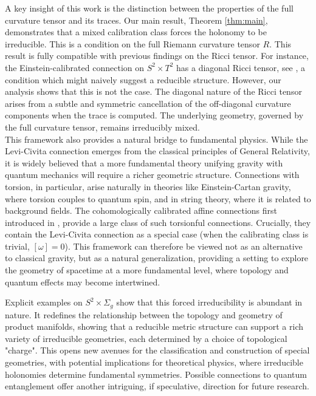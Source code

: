 \documentclass[12pt]{article}
\begin{document}
A key insight of this work is the distinction between the properties of the full curvature tensor and its traces. Our main result, Theorem \ref{thm:main}, demonstrates that a mixed calibration class forces the holonomy to be irreducible. This is a condition on the full Riemann curvature tensor $R$. This result is fully compatible with previous findings on the Ricci tensor. For instance, the Einstein-calibrated connection on $S^2 \times T^2$ has a diagonal Ricci tensor, see \cite{Pigazzini-Toda}, a condition which might naively suggest a reducible structure. However, our analysis shows that this is not the case. The diagonal nature of the Ricci tensor arises from a subtle and symmetric cancellation of the off-diagonal curvature components when the trace is computed. The underlying geometry, governed by the full curvature tensor, remains irreducibly mixed.
\\
This framework also provides a natural bridge to fundamental physics. While the Levi-Civita connection emerges from the classical principles of General Relativity, it is widely believed that a more fundamental theory unifying gravity with quantum mechanics will require a richer geometric structure. Connections with torsion, in particular, arise naturally in theories like Einstein-Cartan gravity, where torsion couples to quantum spin, and in string theory, where it is related to background fields. The cohomologically calibrated affine connections first introduced in \cite{Pigazzini}, provide a large class of such torsionful connections. Crucially, they contain the Levi-Civita connection as a special case (when the calibrating class is trivial, $[\omega]=0$). This framework can therefore be viewed not as an alternative to classical gravity, but as a natural generalization, providing a setting to explore the geometry of spacetime at a more fundamental level, where topology and quantum effects may become intertwined.

Explicit examples on $S^2 \times \Sigma_g$ show that this forced irreducibility is abundant in nature. It redefines the relationship between the topology and geometry of product manifolds, showing that a reducible metric structure can support a rich variety of irreducible geometries, each determined by a choice of topological "charge". This opens new avenues for the classification and construction of special geometries, with potential implications for theoretical physics, where irreducible holonomies determine fundamental symmetries. Possible connections to quantum entanglement offer another intriguing, if speculative, direction for future research.
\end{document}
